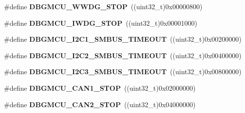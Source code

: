 \begin{DoxyCompactItemize}
\item 
\hypertarget{group___d_b_g_m_c_u___exported___constants_ga9ecfb95a943e2ad165395fff4fa12770}{}\#define {\bfseries D\+B\+G\+M\+C\+U\+\_\+\+W\+W\+D\+G\+\_\+\+S\+T\+O\+P}~((uint32\+\_\+t)0x00000800)\label{group___d_b_g_m_c_u___exported___constants_ga9ecfb95a943e2ad165395fff4fa12770}

\item 
\hypertarget{group___d_b_g_m_c_u___exported___constants_ga5b8b38b5589a2e26a57325553b5dfe23}{}\#define {\bfseries D\+B\+G\+M\+C\+U\+\_\+\+I\+W\+D\+G\+\_\+\+S\+T\+O\+P}~((uint32\+\_\+t)0x00001000)\label{group___d_b_g_m_c_u___exported___constants_ga5b8b38b5589a2e26a57325553b5dfe23}

\item 
\hypertarget{group___d_b_g_m_c_u___exported___constants_ga1c0566af96833376cf1af98449cc914b}{}\#define {\bfseries D\+B\+G\+M\+C\+U\+\_\+\+I2\+C1\+\_\+\+S\+M\+B\+U\+S\+\_\+\+T\+I\+M\+E\+O\+U\+T}~((uint32\+\_\+t)0x00200000)\label{group___d_b_g_m_c_u___exported___constants_ga1c0566af96833376cf1af98449cc914b}

\item 
\hypertarget{group___d_b_g_m_c_u___exported___constants_ga316f8eba36b7a796dd3c6b7d6640b4bf}{}\#define {\bfseries D\+B\+G\+M\+C\+U\+\_\+\+I2\+C2\+\_\+\+S\+M\+B\+U\+S\+\_\+\+T\+I\+M\+E\+O\+U\+T}~((uint32\+\_\+t)0x00400000)\label{group___d_b_g_m_c_u___exported___constants_ga316f8eba36b7a796dd3c6b7d6640b4bf}

\item 
\hypertarget{group___d_b_g_m_c_u___exported___constants_ga95644fa7972fb0b437c77dd98ea1e136}{}\#define {\bfseries D\+B\+G\+M\+C\+U\+\_\+\+I2\+C3\+\_\+\+S\+M\+B\+U\+S\+\_\+\+T\+I\+M\+E\+O\+U\+T}~((uint32\+\_\+t)0x00800000)\label{group___d_b_g_m_c_u___exported___constants_ga95644fa7972fb0b437c77dd98ea1e136}

\item 
\hypertarget{group___d_b_g_m_c_u___exported___constants_ga5ef70e050d1a95f350b6585336a55ca8}{}\#define {\bfseries D\+B\+G\+M\+C\+U\+\_\+\+C\+A\+N1\+\_\+\+S\+T\+O\+P}~((uint32\+\_\+t)0x02000000)\label{group___d_b_g_m_c_u___exported___constants_ga5ef70e050d1a95f350b6585336a55ca8}

\item 
\hypertarget{group___d_b_g_m_c_u___exported___constants_gace53677f1b7b9a52b592cf2b0f3f7178}{}\#define {\bfseries D\+B\+G\+M\+C\+U\+\_\+\+C\+A\+N2\+\_\+\+S\+T\+O\+P}~((uint32\+\_\+t)0x04000000)\label{group___d_b_g_m_c_u___exported___constants_gace53677f1b7b9a52b592cf2b0f3f7178}


\end{DoxyCompactItemize}
